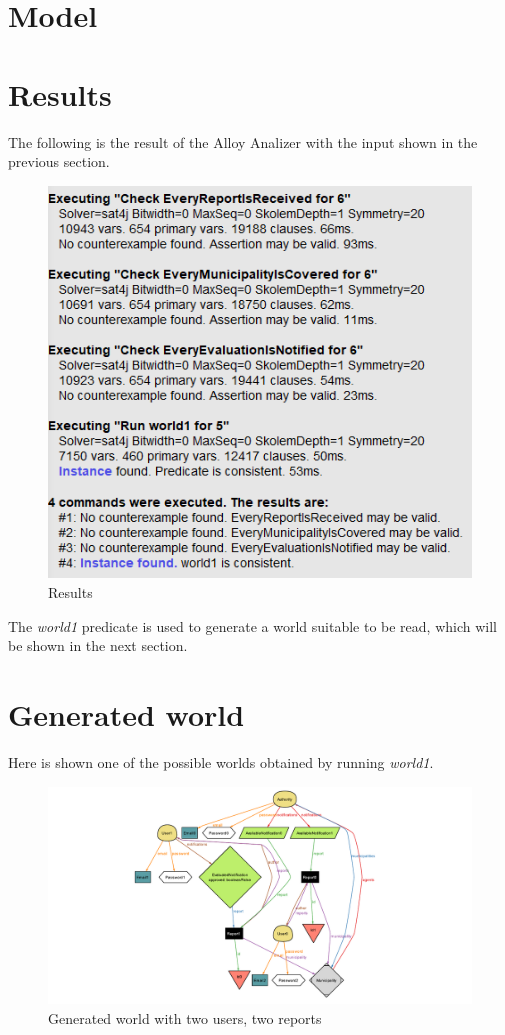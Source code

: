 \documentclass[12pt,a4paper]{report}
\begin{document}
\newpage
	\section{Model}

	

	\newpage

	\section{Results}
	The following is the result of the Alloy Analizer with the input shown in the previous section. 
		\begin{figure}[H]
				\includegraphics[scale = 0.9, center]{Consistency}
				\caption{Results}
		\end{figure}
	The \emph{world1} predicate is used to generate a world suitable to be read, which will be shown in the next section.
	

	\newpage

	\section{Generated world}
	Here is shown one of the possible worlds obtained by running \emph{world1}.


		\begin{figure}[H]
				\includegraphics[scale = 1.4, center]{world1}				
				\caption{Generated world with two users, two reports}
		\end{figure}
\end{document}
